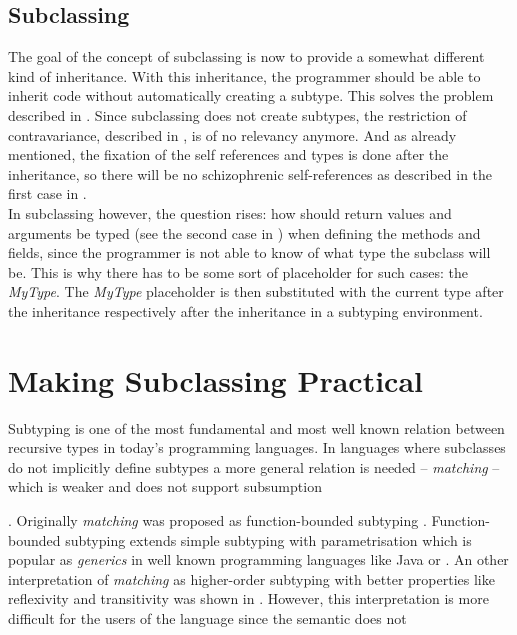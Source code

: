 \subsection{Subclassing}
The goal of the concept of subclassing is now to provide a somewhat
different kind of inheritance. With this inheritance, the programmer
should be able to inherit code without automatically creating a subtype.
This solves the problem described in . Since
subclassing does not create subtypes, the restriction of contravariance,
described in , is of no relevancy
anymore. And as already mentioned, the fixation of the self references
and types is done after the inheritance, so there will be no schizophrenic
self-references as described in the first case in .  
\\

In subclassing however, the question rises: how should return values and
arguments be typed (see the second case in )
when defining the methods and fields, since the programmer is not able to
know of what type the subclass will be. This is why there has to be some
sort of placeholder for such cases: the \emph{MyType}. The \emph{MyType}
placeholder is then substituted with the current type after the
inheritance respectively after the inheritance in a subtyping environment.

\section{Making Subclassing Practical}
\label{ctr:makingSubclassingPractical}
Subtyping is one of the most fundamental and most well known relation
between recursive types in today's programming languages. In languages
where subclasses do not implicitly define subtypes a more general
relation is needed -- \emph{matching} -- which is weaker and does
not support subsumption 

. Originally \emph{matching} was proposed
as function-bounded subtyping \cite{canning_f-bounded_1989}. Function-bounded
subtyping extends simple subtyping with parametrisation which is popular as
\emph{generics} in well known programming languages like Java or \cs
\cite{barron-estrada_inheritance_2003}. An other interpretation of
\emph{matching} as higher-order subtyping with better properties like
reflexivity and transitivity was shown in \cite{abadi_subtyping_1996}. However,
this interpretation is more difficult for the users of the language since
the semantic does not 


